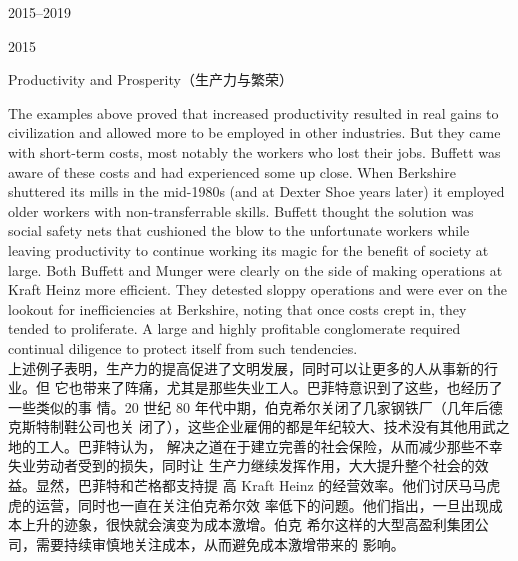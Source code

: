 \begin{chapter}{2015--2019}
\begin{section}{2015}
\begin{subsection}{Productivity and Prosperity（生产力与繁荣）}
\begin{verseparallel}
  {
    The examples above proved that increased productivity resulted in real gains
    to civilization and allowed more to be employed in other industries. But
    they came with short-term costs, most notably the workers who lost their
    jobs. Buffett was aware of these costs and had experienced some up close.
    When Berkshire shuttered its mills in the mid-1980s (and at Dexter Shoe
    years later) it employed older workers with non-transferrable skills.
    Buffett thought the solution was social safety nets that cushioned the blow
    to the unfortunate workers while leaving productivity to continue working
    its magic for the benefit of society at large.  Both Buffett and Munger
    were clearly on the side of making operations at Kraft Heinz more efficient.
    They detested sloppy operations and were ever on the lookout for
    inefficiencies at Berkshire, noting that once costs crept in, they tended to
    proliferate. A large and highly profitable conglomerate required continual
    diligence to protect itself from such tendencies. \\
  }
  {
    上述例子表明，生产力的提高促进了文明发展，同时可以让更多的人从事新的行业。但
    它也带来了阵痛，尤其是那些失业工人。巴菲特意识到了这些，也经历了一些类似的事
    情。20 世纪 80 年代中期，伯克希尔关闭了几家钢铁厂（几年后德克斯特制鞋公司也关
    闭了），这些企业雇佣的都是年纪较大、技术没有其他用武之地的工人。巴菲特认为，
    解决之道在于建立完善的社会保险，从而减少那些不幸失业劳动者受到的损失，同时让
    生产力继续发挥作用，大大提升整个社会的效益。显然，巴菲特和芒格都支持提
    高 Kraft Heinz 的经营效率。他们讨厌马马虎虎的运营，同时也一直在关注伯克希尔效
    率低下的问题。他们指出，一旦出现成本上升的迹象，很快就会演变为成本激增。伯克
    希尔这样的大型高盈利集团公司，需要持续审慎地关注成本，从而避免成本激增带来的
    影响。
  }
\end{verseparallel}

\end{subsection}

\end{section}

\theendnotes{}

\end{chapter}

